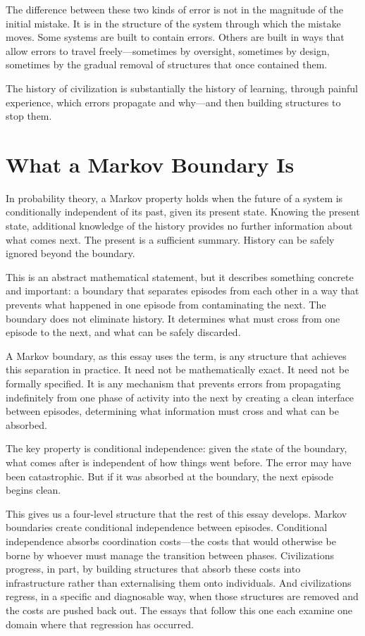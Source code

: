 \documentclass[12pt, a4paper]{article}
\begin{document}
The difference between these two kinds of error is not in the magnitude
of the initial mistake. It is in the structure of the system through
which the mistake moves. Some systems are built to contain errors.
Others are built in ways that allow errors to travel freely---sometimes
by oversight, sometimes by design, sometimes by the gradual removal
of structures that once contained them.

The history of civilization is substantially the history of learning,
through painful experience, which errors propagate and why---and then
building structures to stop them.

\section{What a Markov Boundary Is}

In probability theory, a Markov property holds when the future of a
system is conditionally independent of its past, given its present
state. Knowing the present state, additional knowledge of the history
provides no further information about what comes next. The present is
a sufficient summary. History can be safely ignored beyond the
boundary.

This is an abstract mathematical statement, but it describes something
concrete and important: a boundary that separates episodes from each
other in a way that prevents what happened in one episode from
contaminating the next. The boundary does not eliminate history. It
determines what must cross from one episode to the next, and what can
be safely discarded.

A Markov boundary, as this essay uses the term, is any structure that
achieves this separation in practice. It need not be mathematically
exact. It need not be formally specified. It is any mechanism that
prevents errors from propagating indefinitely from one phase of
activity into the next by creating a clean interface between episodes,
determining what information must cross and what can be absorbed.

The key property is conditional independence: given the state of the
boundary, what comes after is independent of how things went before.
The error may have been catastrophic. But if it was absorbed at the
boundary, the next episode begins clean.

This gives us a four-level structure that the rest of this essay
develops. Markov boundaries create conditional independence between
episodes. Conditional independence absorbs coordination costs---the
costs that would otherwise be borne by whoever must manage the
transition between phases. Civilizations progress, in part, by
building structures that absorb these costs into infrastructure rather
than externalising them onto individuals. And civilizations regress,
in a specific and diagnosable way, when those structures are removed
and the costs are pushed back out. The essays that follow this one
each examine one domain where that regression has occurred.
\end{document}
